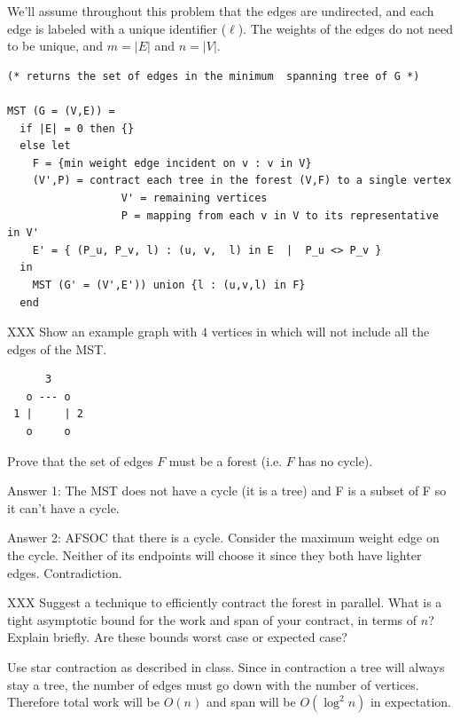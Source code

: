 We'll assume throughout this problem that the edges are undirected,
and each edge is labeled with a unique identifier ($\ell$). The
weights of the edges do not need to be unique, and $m = |E|$ and $n =
|V|$.

\begin{lstlisting}[language=caml, numbers=none]
(* returns the set of edges in the minimum  spanning tree of G *)

MST (G = (V,E)) = 
  if |E| = 0 then {}
  else let
    F = {min weight edge incident on v : v in V}
    (V',P) = contract each tree in the forest (V,F) to a single vertex
                  V' = remaining vertices
                  P = mapping from each v in V to its representative in V'
    E' = { (P_u, P_v, l) : (u, v,  l) in E  |  P_u <> P_v }
  in 
    MST (G' = (V',E')) union {l : (u,v,l) in F}
  end
\end{lstlisting}

\begin{problem}
XXX
\ask[4.]
Show an example graph with $4$ vertices in which  will not include all
the edges of the MST.

\sol
\begin{verbatim}
      3
   o --- o
 1 |     | 2
   o     o
\end{verbatim}

\ask[4]
Prove that the set of edges $F$ must be a forest (i.e. $F$ has no cycle).

\sol
Answer 1: The MST does not have a cycle (it is a tree) and F is a subset of F
so it can't have a cycle.

Answer 2: AFSOC that there is a cycle.  Consider the maximum weight
edge on the cycle.  Neither of its endpoints will choose it since they
both have lighter edges.  Contradiction.
\end{problem}

\newpage

\begin{problem}[4.]
XXX
\ask
Suggest a technique to efficiently contract the forest in parallel.
What is a tight asymptotic bound for the work and span of your contract,
in terms of $n$? Explain briefly. Are these bounds worst case or
expected case?

\sol
Use star contraction as described in class. Since in contraction a tree
will always stay a tree, the number of edges must go down with the number
of vertices. Therefore total work will be $O(n)$ and span will be
$O(\log^2 n)$ in expectation.
\end{problem}

